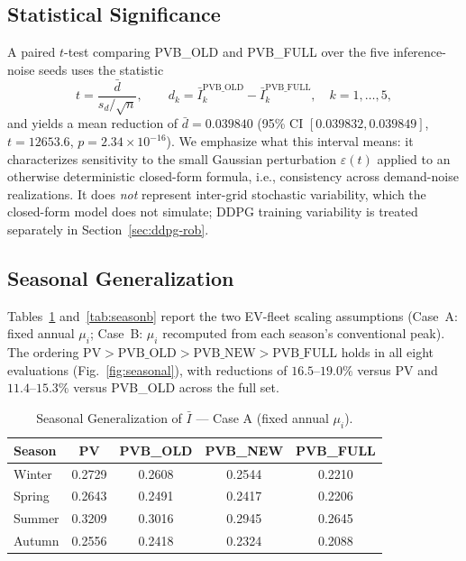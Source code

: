 \documentclass[10pt,journal]{IEEEtran}
\begin{document}
\subsection{Statistical Significance}
A paired $t$-test comparing PVB\_OLD and PVB\_FULL over the five
inference-noise seeds uses the statistic
\begin{equation}\label{eq:ttest}
  t=\frac{\bar d}{s_d/\sqrt{n}},\qquad
  d_k=\bar I_k^{\mathrm{PVB\_OLD}}-\bar I_k^{\mathrm{PVB\_FULL}},
  \quad k=1,\dots,5,
\end{equation}
and yields a mean reduction of $\bar d=0.039840$
(95\% CI $[0.039832,0.039849]$, $t=12653.6$, $p=2.34\times10^{-16}$). We
emphasize what this interval means: it characterizes sensitivity to the
small Gaussian perturbation $\varepsilon(t)$ applied to an otherwise
deterministic closed-form formula, i.e., consistency across demand-noise
realizations. It does \emph{not} represent inter-grid stochastic
variability, which the closed-form model does not simulate; DDPG training
variability is treated separately in Section~\ref{sec:ddpg-rob}.

\subsection{Seasonal Generalization}
Tables~\ref{tab:season} and~\ref{tab:seasonb} report the two EV-fleet
scaling assumptions (Case~A: fixed annual $\mu_i$; Case~B: $\mu_i$
recomputed from each season's conventional peak). The ordering
$\mathrm{PV}>\mathrm{PVB\_OLD}>\mathrm{PVB\_NEW}>\mathrm{PVB\_FULL}$ holds
in all eight evaluations (Fig.~\ref{fig:seasonal}), with reductions of
$16.5$--$19.0\%$ versus PV and
$11.4$--$15.3\%$ versus PVB\_OLD across the full set.

\begin{table}[!t]
\footnotesize
\setlength{\tabcolsep}{4pt}
\caption{Seasonal Generalization of $\bar I$ --- Case A (fixed annual
$\mu_i$).}
\label{tab:season}
\centering
\begin{tabular}{lcccc}\toprule
Season & PV & PVB\_OLD & PVB\_NEW & PVB\_FULL \\ \midrule
Winter & 0.2729 & 0.2608 & 0.2544 & 0.2210 \\
Spring & 0.2643 & 0.2491 & 0.2417 & 0.2206 \\
Summer & 0.3209 & 0.3016 & 0.2945 & 0.2645 \\
Autumn & 0.2556 & 0.2418 & 0.2324 & 0.2088 \\ \bottomrule
\end{tabular}
\end{table}
\end{document}
